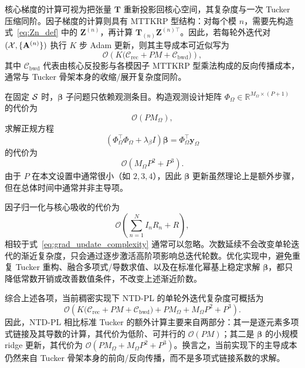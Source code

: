 核心梯度的计算可视为把张量 $\mathbf T$ 重新投影回核心空间，其复杂度与一次 Tucker 压缩同阶。因子梯度的计算则具有 MTTKRP 型结构：对每个模 $n$，需要先构造式~\eqref{eq:Zn_def} 中的 $\mathbf Z^{(n)}$，再计算 $\mathbf T_{(n)}\mathbf Z^{(n)\top}$。因此，若每轮外迭代对 $(\mathcal{X},\{\mathbf A^{(n)}\})$ 执行 $K$ 步 Adam 更新，则其主导成本可近似写为
\begin{equation}
\mathcal O\!\left(
K\bigl(\mathcal C_{\mathrm{rec}} + PM + \mathcal C_{\mathrm{bwd}}\bigr)
\right),
\label{eq:grad_update_complexity}
\end{equation}
其中 $\mathcal C_{\mathrm{bwd}}$ 代表由核心反投影与各模因子 MTTKRP 型乘法构成的反向传播成本，通常与 Tucker 骨架本身的收缩/展开复杂度同阶。

在固定 $\mathcal{S}$ 时，$\boldsymbol\beta$ 子问题只依赖观测条目。构造观测设计矩阵 $\Phi_\Omega\in\mathbb R^{M_\Omega\times(P+1)}$ 的代价为
\begin{equation}
\mathcal O(PM_\Omega),
\end{equation}
求解正规方程
\begin{equation}
(\Phi_\Omega^\top\Phi_\Omega+\lambda_\beta I)\boldsymbol\beta
=
\Phi_\Omega^\top\mathbf y_\Omega
\end{equation}
的代价为
\begin{equation}
\mathcal O(M_\Omega P^2 + P^3).
\label{eq:beta_update_complexity}
\end{equation}
由于 $P$ 在本文设置中通常很小（如 $2,3,4$），因此 $\boldsymbol\beta$ 更新虽然理论上是额外步骤，但在总体时间中通常并非主导项。

因子归一化与核心吸收的代价为
\begin{equation}
\mathcal O\!\left(\sum_{n=1}^{N} I_nR_n + R\right),
\end{equation}
相较于式~\eqref{eq:grad_update_complexity} 通常可以忽略。次数延续不会改变单轮迭代的渐近复杂度，只会通过逐步激活高阶项影响总迭代轮数。优化实现中，避免重复 Tucker 重构、融合多项式/导数求值、以及在标准化幂基上稳定求解 $\boldsymbol\beta$，都只降低常数开销或改善数值条件，不改变上述渐近阶数。

综合上述各项，当前稠密实现下 NTD-PL 的单轮外迭代复杂度可概括为
\begin{equation}
\mathcal O\!\left(
K\bigl(\mathcal C_{\mathrm{rec}} + PM + \mathcal C_{\mathrm{bwd}}\bigr)
+
PM_\Omega + M_\Omega P^2 + P^3
\right).
\label{eq:total_complexity_main}
\end{equation}
因此，NTD-PL 相比标准 Tucker 的额外计算主要来自两部分：其一是逐元素多项式链接及其导数的计算，其代价为低阶、可并行的 $\mathcal O(PM)$；其二是 $\boldsymbol\beta$ 的小规模 ridge 更新，其代价为 $\mathcal O(PM_\Omega + M_\Omega P^2 + P^3)$。换言之，当前实现下的主导成本仍然来自 Tucker 骨架本身的前向/反向传播，而不是多项式链接系数的求解。

